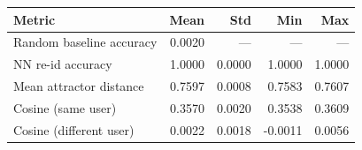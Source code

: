 \begin{tabular}{lrrrr}
\toprule
\textbf{Metric} & \textbf{Mean} & \textbf{Std} & \textbf{Min} & \textbf{Max} \\
\midrule
Random baseline accuracy & 0.0020 & --- & --- & --- \\
NN re-id accuracy & 1.0000 & 0.0000 & 1.0000 & 1.0000 \\
Mean attractor distance & 0.7597 & 0.0008 & 0.7583 & 0.7607 \\
Cosine (same user) & 0.3570 & 0.0020 & 0.3538 & 0.3609 \\
Cosine (different user) & 0.0022 & 0.0018 & -0.0011 & 0.0056 \\
\bottomrule
\end{tabular}
